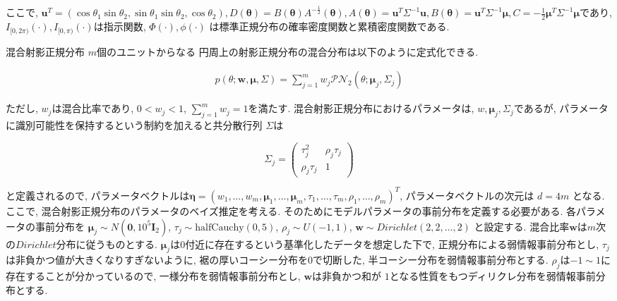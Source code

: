 \documentclass[a4j,11pt]{jarticle}
\makeatletter
\def\subsection{\@startsection{subsection}{1}{\z@}
   {0.8\Cvs \@plus.5\Cdp \@minus.2\Cdp}
   {0.2\Cvs \@plus.3\Cdp}
   {\normalfont \normalsize \bfseries}}
\makeatother
\begin{document}
\noindent
ここで, $\bm u^T = (\cos\theta_1 \sin \theta_2, \sin\theta_1 \sin \theta_2, \cos \theta_2), 
D(\bm \theta) = B(\bm \theta) A^{-\frac{1}{2}}(\bm \theta), A(\bm \theta) = \bm u^T \Sigma^{-1} \bm u,  B(\bm \theta) = \bm u^T \Sigma^{-1} \bm \mu, C = -\frac{1}{2} \bm \mu^T \Sigma^{-1} \bm \mu$であり, $I_{[0,2\pi)} (\cdot), I_{[0,\pi)}(\cdot)$は指示関数, $\Phi(\cdot), \phi(\cdot)$ は標準正規分布の確率密度関数と累積密度関数である.

\vspace{-1zh}
\subsection{混合射影正規分布}
$m$個のユニットからなる 円周上の射影正規分布の混合分布は以下のように定式化できる. 

\vspace{-2zh}
\begin{eqnarray*}
p(\theta;\bm w,\bm \mu, \Sigma) = \sum^m_{j=1} w_j \mathcal{PN}_2(\theta;\bm \mu_j, \Sigma_j) 
\end{eqnarray*}

\vspace{-1zh}
\noindent
ただし, $w_j$は混合比率であり, $0 < w_j < 1$, $\sum^m_{j=1} w_j = 1$を満たす. 混合射影正規分布におけるパラメータは, $w, \bm \mu_j, \Sigma_j$であるが, パラメータに識別可能性を保持するという制約を加えると共分散行列 $\Sigma$は

\vspace{-1zh}
\[
 \Sigma_j = \left(
    \begin{array}{cc}
      \tau_j^2 & \rho_j \tau_j \\
      \rho_j \tau_j & 1
    \end{array}
  \right)
\]

\vspace{-0.5zh}
\noindent
と定義されるので, パラメータベクトルは$\bm \eta = (w_1, \dots, w_m, \bm \mu_1, \dots, \bm \mu_m, \tau_1, \dots, \tau_m, \rho_1, \dots, \rho_m)^T$, パラメータベクトルの次元は $d = 4m$ となる. ここで, 混合射影正規分布のパラメータのベイズ推定を考える. そのためにモデルパラメータの事前分布を定義する必要がある. 各パラメータの事前分布を $\bm \mu_j \sim N(\bm 0, 10^5 \bm I_2)$, $\tau_j \sim \mathrm{half Cauchy}(0,5)$, $\rho_j \sim U(-1,1)$, $\bm w \sim Dirichlet(2,2, \dots, 2)$ と設定する. 混合比率$\bm w$は$m$次の$Dirichlet$分布に従うものとする. $\bm \mu_j$は$0$付近に存在するという基準化したデータを想定した下で, 正規分布による弱情報事前分布とし, $\tau_j$は非負かつ値が大きくなりすぎないように, 裾の厚いコーシー分布を$0$で切断した, 半コーシー分布を弱情報事前分布とする. $\rho_j$は$-1 \sim 1$に存在することが分かっているので, 一様分布を弱情報事前分布とし, $\bm w$は非負かつ和が $1$となる性質をもつディリクレ分布を弱情報事前分布とする.
\end{document}
